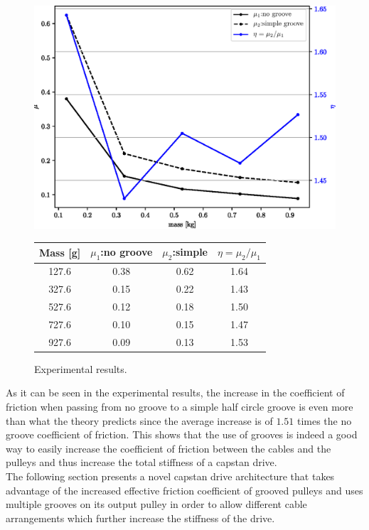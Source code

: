 \documentclass[10pt,cleanfoot]{asme2ej}
\begin{document}
\begin{figure}
\centering
\includegraphics[width=0.47\columnwidth]{fig_exp.eps}
\qquad
\begin{tabular}[b]{cccc}\hline
      Mass [g] & $\mu_{1}$:no groove & $\mu_{2}$:simple & $\eta=\mu_{2}/\mu_{1}$\\ \hline
      127.6 & 0.38 & 0.62 & 1.64\\
      327.6 & 0.15 & 0.22 & 1.43\\
      527.6 & 0.12 & 0.18 & 1.50\\
      727.6 & 0.10 & 0.15 & 1.47\\
      927.6 & 0.09 & 0.13 & 1.53\\ \hline
      
    \end{tabular}
    \label{tab:exp_tab}
    \captionsetup{labelformat=andtable}
    \caption{Experimental results.}
\end{figure}
\par
As it can be seen in the experimental results, the increase in the coefficient of friction when passing from no groove to a simple half circle groove is even more than what the theory predicts since the average increase is of $1.51$ times the no groove coefficient of friction. This shows that the use of grooves is indeed a good way to easily increase the coefficient of friction between the cables and the pulleys and thus increase the total stiffness of a capstan drive.
\\ 
 The following section presents a novel capstan drive architecture that takes advantage of the increased effective friction coefficient of grooved pulleys and uses multiple grooves on its output pulley in order to allow different cable arrangements which further increase the stiffness of the drive.
\end{document}
